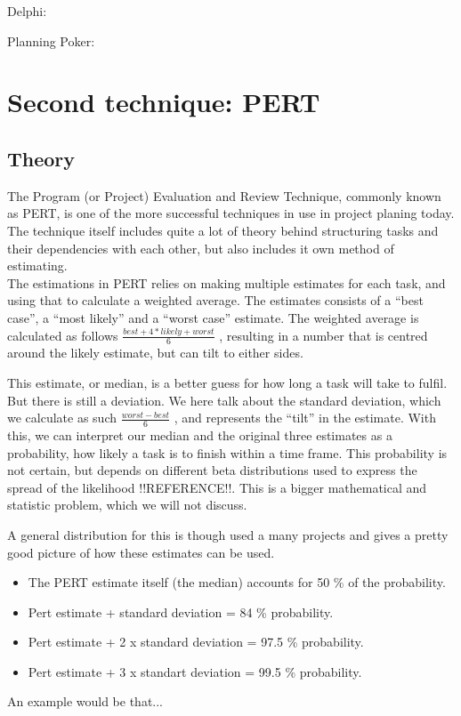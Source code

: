 Delphi:


Planning Poker:


\section{Second technique: PERT}
\subsection{Theory}

The Program (or Project) Evaluation and Review Technique, commonly known as PERT, is one of the more successful techniques in use in project planing today. The technique itself includes quite a lot of theory behind structuring tasks and their dependencies with each other, but also includes it own method of estimating.\\

The estimations in PERT relies on making multiple estimates for each task, and using that to calculate a weighted average. The estimates consists of a ``best case'', a ``most likely'' and a ``worst case'' estimate. The weighted average is calculated as follows
$\frac{best+4*likely+worst}{6}$
, resulting in a number that is centred around the likely estimate, but can tilt to either sides.\
 
This estimate, or median, is a better guess for how long a task will take to fulfil. But there is still a deviation. We here talk about the standard deviation, which we calculate as such
$\frac{worst-best}{6}$
, and represents the ``tilt'' in the estimate. With this, we can interpret our median and the original three estimates as a probability, how likely a task is to finish within a time frame. This probability is not certain, but depends on different beta distributions used to express the spread of the likelihood !!REFERENCE!!. This is a bigger mathematical and statistic problem, which we will not discuss.\

A general distribution for this is though used a many projects and gives a pretty good picture of how these estimates can be used.\
\begin{itemize}


\item The PERT estimate itself (the median) accounts for 50 \% of the probability.
\item Pert estimate + standard deviation = 84 \% probability.
\item Pert estimate + 2 x standard deviation = 97.5 \% probability.
\item Pert estimate + 3 x standart deviation = 99.5 \% probability.
\end{itemize}
An example would be that...


